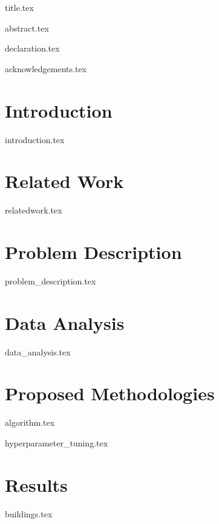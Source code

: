 \documentclass[a4paper, 11pt]{article}
\begin{document}
\setlength{\abovedisplayskip}{3pt}
\setlength{\belowdisplayskip}{3pt}

{title.tex}
\pagebreak

{abstract.tex}

{declaration.tex}

{acknowledgements.tex}

\thispagestyle{empty}
\setcounter{tocdepth}{3}
\tableofcontents{}
\pagebreak

\setcounter{page}{1}

\section{Introduction}

{introduction.tex}

\section{Related Work}

{relatedwork.tex}

\section{Problem Description}

{problem_description.tex}

\section{Data Analysis}

{data_analysis.tex}

\section{Proposed Methodologies} \label{methodologies}

{algorithm.tex}

{hyperparameter_tuning.tex}


\section{Results}

{buildings.tex}
\end{document}
